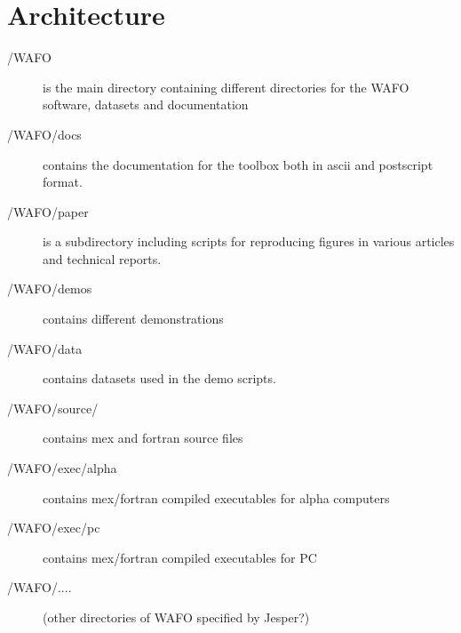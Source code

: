\documentclass[10pt,a4paper]{article}   %
\begin{document}
\section{Architecture}
\begin{description}
\item[/WAFO] is the main directory containing different directories for the  WAFO software, datasets and documentation
\item[/WAFO/docs] contains the documentation for the toolbox both in ascii and postscript format.
\item[/WAFO/paper] is a subdirectory including scripts for reproducing figures in various articles and technical reports.
\item[/WAFO/demos] contains different demonstrations
\item[/WAFO/data] contains datasets used in the demo scripts.
\item[/WAFO/source/] contains mex and fortran source files
\item[/WAFO/exec/alpha] contains mex/fortran compiled executables for alpha computers
\item[/WAFO/exec/pc] contains mex/fortran compiled executables for PC
\item[/WAFO/....] (other directories of WAFO specified by Jesper?) 
\end{description}
\end{document}

